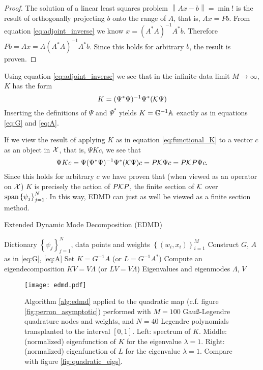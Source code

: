 \begin{proof}
    The solution of a linear least squares problem $\left\| Ax - b \right\| = \min !$ is 
    the result of orthogonally projecting $b$ onto the range of $A$, that is, $A x = P b$. 
    From equation \ref{eq:adjoint_inverse} we know $x = (A^* A)^{-1} A^* b$. Therefore 
    $P b = A x = A (A^* A)^{-1} A^* b$. Since this holds for arbitrary $b$, the result 
    is proven. 
\end{proof}

Using equation \ref{eq:adjoint_inverse} we see that in the infinite-data limit 
$M \to \infty$, $K$ has the form
\begin{equation}
    \label{eq:functional_K}
    K = (\Psi^* \Psi)^{-1} \Psi^* (\mathcal{K} \Psi)
\end{equation}
Inserting the definitions of $\Psi$ and $\Psi^*$ yields $K = \mathbb{G}^{-1} \mathbb{A}$ exactly as 
in equations \ref{eq:G} and \ref{eq:A}. 

If we view the result of applying $K$ as in equation \ref{eq:functional_K} to a vector 
$c$ as an object in $\mathcal{X}$, that is, $\Psi K c$, we see that 
\begin{equation}
    \label{eq:PKP}
    \Psi K c = \Psi (\Psi^* \Psi)^{-1} \Psi^* (\mathcal{K} \Psi) c
    = P \mathcal{K} \Psi c = P \mathcal{K} P \Psi c . 
\end{equation}
Since this holds for arbitrary $c$ we have proven that (when viewed as an operator 
on $\mathcal{X}$) $K$ is precisely the action of $P \mathcal{K} P$, the finite section of $\mathcal{K}$ 
over $\text{span} \left\{ \psi_j \right\}_{j=1}^N$. In this way, EDMD can just as well be viewed 
as a finite section method. 

\begin{algorithm}
    \caption{Extended Dynamic Mode Decomposition (EDMD)}
    \label{alg:edmd}
    \begin{algorithmic}[1]
        \Require Dictionary $\left\{ \psi_j \right\}_{j=1}^N$, data points and weights 
            $\left\{ (w_i, x_i) \right\}_{i=1}^M$
        \State Construct $G$, $A$ as in \ref{eq:G}, \ref{eq:A}
        \State Set $K = G^{-1} A$ (or $L = G^{-1} A^*$)
        \State Compute an eigendecomposition $K V = V \Lambda$ (or $L V = V \Lambda$)
        \State \Return Eigenvalues and eigenmodes $\Lambda$, $V$
    \end{algorithmic}
\end{algorithm}

\begin{figure}
    \centering
    \texttt{[image: edmd.pdf]}
    \caption{
        Algorithm \ref{alg:edmd} applied to the quadratic map (c.f. figure 
        \ref{fig:perron_asymptotic}) performed with $M = 100$ Gauß-Legendre quadrature 
        nodes and weights, and $N = 40$ Legendre polynomials transplanted to the interval 
        $[0, 1]$. Left: spectrum of $K$. Middle: (normalized) eigenfunction of $K$ for 
        the eigenvalue $\lambda = 1$. Right: (normalized) eigenfunction of $L$ for the 
        eigenvalue $\lambda = 1$. Compare with figure \ref{fig:quadratic_eigs}. 
    }
\end{figure}

